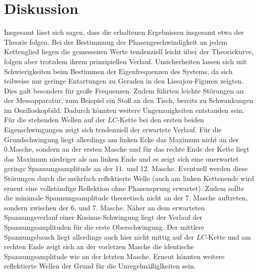 \section{Diskussion}
\label{sec:Diskussion}
Insgesamt lässt sich sagen, dass die erhaltenen Ergebnissen insgesamt etwa der Theorie folgen.
Bei der Bestimmung der Phasengeschwindigkeit an jedem Kettenglied liegen die gemessenen Werte tendenziell leicht über der Theoriekurve, folgen aber trotzdem ihrem prinzipiellen Verlauf.
Unsicherheiten lassen sich mit Schwierigkeiten beim Bestimmen der Eigenfrequenzen des Systems, da sich teilweise nur geringe Entartungen zu Geraden in den Lissajou-Figuren zeigten. Dies galt besonders für große Frequenzen. Zudem führten leichte Störungen an der Messapparatur, zum Beispiel ein Stoß an den Tisch, bereits zu Schwankungen im Oszilloskopbild. Dadurch könnten weitere Ungenauigkeiten entstanden sein.
Für die stehenden Wellen auf der $LC$-Kette bei den ersten beiden Eigenschwingungen zeigt sich tendenziell der erwartete Verlauf.
Für die Grundschwingung liegt allerdings am linken Ecke das Maximum nicht an der 0.Masche, sondern an der ersten Masche und für das rechte Ende der Kette liegt das Maximum niedriger als am linken Ende und es zeigt sich eine unerwartet geringe Spannungsamplitude an der 11. und 12. Masche.
Eventuell werden diese Störungen durch die mehrfach reflektierte Welle (auch am linken Kettenende wird erneut eine vollständige Reflektion ohne Phasensprung erwartet).
Zudem sollte die minimale Spannungsamplitude theoretisch nicht an der 7. Masche auftreten, sondern zwischen der 6. und 7. Masche.
Näher an dem erwarteten Spannungsverlauf einer Kosinus-Schwingung liegt der Verlauf der Spannungsamplituden für die erste Oberschwingung.
Der mittlere Spannungsbauch liegt allerdings auch hier nicht mittig auf der $LC$-Kette und am rechten Ende zeigt sich an der vorletzen Masche die identische Spannungsamplitude wie an der letzten Masche.
Erneut könnten weitere reflektierte Wellen der Grund für die Unregelmäßiglkeiten sein. 
